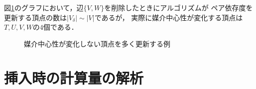 \begin{example}
  図\ref{fig:bc-many-phony}のグラフにおいて，辺$\{V,W\}$を削除したときにアルゴリズムが
  ペア依存度を更新する頂点の数は$\lvert V_\delta\rvert\sim \lvert V\rvert$であるが，
  実際に媒介中心性が変化する頂点は$T,U,V,W$の$4$個である．

  \begin{figure}[tb]
    \centering
    \def\svgwidth{.8\linewidth}
    
    \caption{媒介中心性が変化しない頂点を多く更新する例}
    \label{fig:bc-many-phony}
  \end{figure}
\end{example}

\section{挿入時の計算量の解析}
\label{subsect:computational-complexity-of-incremental-algorithm}

